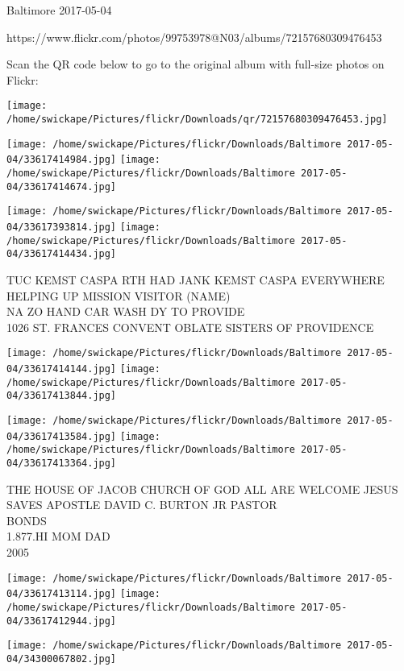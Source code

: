 \documentclass[10pt,letterpaper]{article}
\begin{document}
Baltimore 2017-05-04

https://www.flickr.com/photos/99753978@N03/albums/72157680309476453

Scan the QR code below to go to the original album with full-size photos on Flickr:

\texttt{[image: /home/swickape/Pictures/flickr/Downloads/qr/72157680309476453.jpg]}
\pagebreak

\texttt{[image: /home/swickape/Pictures/flickr/Downloads/Baltimore 2017-05-04/33617414984.jpg]}
\texttt{[image: /home/swickape/Pictures/flickr/Downloads/Baltimore 2017-05-04/33617414674.jpg]}

\texttt{[image: /home/swickape/Pictures/flickr/Downloads/Baltimore 2017-05-04/33617393814.jpg]}
\texttt{[image: /home/swickape/Pictures/flickr/Downloads/Baltimore 2017-05-04/33617414434.jpg]}

TUC KEMST CASPA RTH HAD JANK KEMST CASPA EVERYWHERE\\
HELPING UP MISSION VISITOR (NAME)\\
NA ZO HAND CAR WASH DY TO PROVIDE\\
1026 ST. FRANCES CONVENT OBLATE SISTERS OF PROVIDENCE
\pagebreak

\texttt{[image: /home/swickape/Pictures/flickr/Downloads/Baltimore 2017-05-04/33617414144.jpg]}
\texttt{[image: /home/swickape/Pictures/flickr/Downloads/Baltimore 2017-05-04/33617413844.jpg]}

\texttt{[image: /home/swickape/Pictures/flickr/Downloads/Baltimore 2017-05-04/33617413584.jpg]}
\texttt{[image: /home/swickape/Pictures/flickr/Downloads/Baltimore 2017-05-04/33617413364.jpg]}

THE HOUSE OF JACOB CHURCH OF GOD ALL ARE WELCOME JESUS SAVES APOSTLE DAVID C. BURTON JR PASTOR\\
BONDS\\
1.877.HI MOM DAD\\
2005
\pagebreak

\texttt{[image: /home/swickape/Pictures/flickr/Downloads/Baltimore 2017-05-04/33617413114.jpg]}
\texttt{[image: /home/swickape/Pictures/flickr/Downloads/Baltimore 2017-05-04/33617412944.jpg]}

\vspace{0.25in}
\texttt{[image: /home/swickape/Pictures/flickr/Downloads/Baltimore 2017-05-04/34300067802.jpg]}
\end{document}
